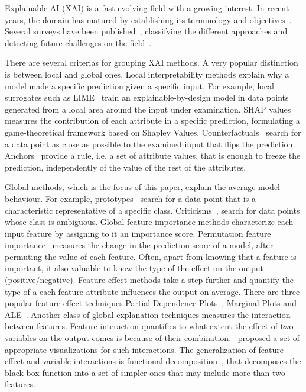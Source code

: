 Explainable AI (XAI) is a fast-evolving field with a growing
interest. In recent years, the domain has matured by establishing its
terminology and objectives~\cite{Hoffman2018}. Several surveys have
been published~\cite{BarredoArrieta2020}, %
classifying
the different approaches and detecting future challenges on the
field~\cite{Molnar2020}.

There are several criterias for grouping XAI methods. A very popular
distinction is between local and global ones. Local interpretability
methods explain why a model made a specific prediction given a
specific input. For example, local surrogates such as
LIME~\cite{Ribeiro2016} train an explainable-by-design model in data
points generated from a local area around the input under
examination. SHAP values~\cite{Lundberg2017} measures the contribution
of each attribute in a specific prediction, formulating a
game-theoretical framework based on Shapley
Values. Counterfactuals~\cite{Wachter2017} search for a data point as
close as possible to the examined input that flips the
prediction. Anchors~\cite{Ribeiro2018} provide a rule, i.e. a set of
attribute values, that is enough to freeze the prediction,
independently of the value of the rest of the attributes.


Global methods, which is the focus of this paper, explain the average
model behaviour. For example, prototypes~\cite{Gurumoorthy2019} search
for a data point that is a characteristic representative of a specific
class. Criticisms~\cite{Kim2016}, search for data points whose class
is ambiguous. Global feature importance methods characterize each
input feature by assigning to it an importance score. Permutation
feature importance~\cite{Fisher2019} measures the change in the
prediction score of a model, after permuting the value of each
feature. Often, apart from knowing that a feature is important, it
also valuable to know the type of the effect on the output
(positive/negative). Feature effect methods take a step further and
quantify the type of a each feature attribute influences the output on
average. There are three popular feature effect techniques Partial
Dependence Plots~\cite{Friedman2001}, Marginal Plots and
ALE~\cite{Apley2020}. Another class of global explanation techniques
measures the interaction~\cite{Friedman2008} between features. Feature
interaction quantifies to what extent the effect of two variables on
the output comes is because of their combination.~\cite{Friedman2008}
proposed a set of appropriate visualizations for such
interactions. The generalization of feature effect and variable
interactions is functional decomposition~\cite{Molnar2021}, that
decomposes the black-box function into a set of simpler ones that may
include more than two features.

